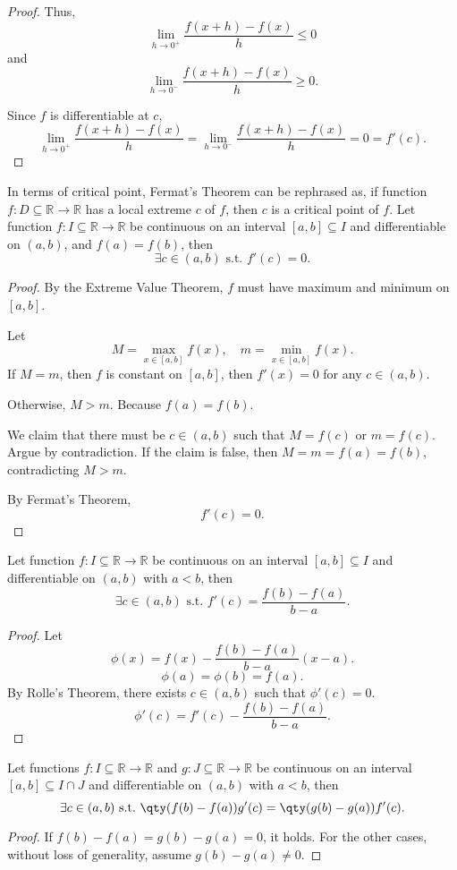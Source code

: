 \documentclass[a4paper,12pt]{report}
\begin{document}
\begin{itemize}
\begin{itemize}
\begin{proof}
Thus,
\[\lim_{h\to 0^+}\frac{f(x+h)-f(x)}{h}\leq 0\]
and
\[\lim_{h\to 0^-}\frac{f(x+h)-f(x)}{h}\geq 0.\]

Since $f$ is differentiable at $c$,
\[\lim_{h\to 0^+}\frac{f(x+h)-f(x)}{h}=\lim_{h\to 0^-}\frac{f(x+h)-f(x)}{h}=0=f'(c).\]
\end{proof}
In terms of critical point, Fermat's Theorem can be rephrased as, if function $f\colon D\subseteq\mathbb{R}\to\mathbb{R}$ has a local extreme $c$ of $f$, then $c$ is a critical point of $f$.
Let function $f\colon I\subseteq\mathbb{R}\to\mathbb{R}$ be continuous on an interval $[a, b]\subseteq I$ and differentiable on $(a,b)$, and $f(a)=f(b)$, then
\[\exists c\in (a, b)\text{\ s.t.\ }f'(c)=0.\]
\begin{proof}
By the Extreme Value Theorem, $f$ must have maximum and minimum on $[a,b]$.

Let
\[M=\max_{x\in [a,b]}f(x),\quad m=\min_{x\in [a,b]}f(x).\]
If $M=m$, then $f$ is constant on $[a,b]$, then $f'(x)=0$ for any $c\in (a,b)$.

Otherwise, $M>m$. Because $f(a)=f(b)$. 

We claim that there must be $c\in (a,b)$ such that $M=f(c)$ or $m=f(c)$. Argue by contradiction. If the claim is false, then $M=m=f(a)=f(b)$, contradicting $M>m$.

By Fermat's Theorem,
\[f'(c)=0.\]
\end{proof}
Let function $f\colon I\subseteq\mathbb{R}\to\mathbb{R}$ be continuous on an interval $[a, b]\subseteq I$ and differentiable on $(a,b)$ with $a<b$, then
\[\exists c\in (a, b)\text{\ s.t.\ }f'(c)=\frac{f(b)-f(a)}{b-a}.\]
\begin{proof}
Let
\[\phi(x) = f(x) - \frac{f(b)-f(a)}{b-a} (x-a).\]
\[\phi(a)=\phi(b)=f(a).\]
By Rolle's Theorem, there exists $c\in (a,b)$ such that $\phi'(c)=0$.
\[\phi'(c)=f'(c)-\frac{f(b)-f(a)}{b-a}.\]
\end{proof}
Let functions $f\colon I\subseteq\mathbb{R}\to\mathbb{R}$ and $g\colon J\subseteq\mathbb{R}\to\mathbb{R}$ be continuous on an interval $[a, b]\subseteq I\cap J$ and differentiable on $(a,b)$ with $a<b$, then
\[\exists c\in (a,b)\text{\ s.t.\ }\qty(f(b)-f(a))g'(c)=\qty(g(b)-g(a))f'(c).\]
\begin{proof}
    If $f(b)-f(a)=g(b)-g(a)=0$, it holds. For the other cases, without loss of generality, assume $g(b)-g(a)\neq 0$.


\end{proof}
\end{itemize}
\end{itemize}
\end{document}
